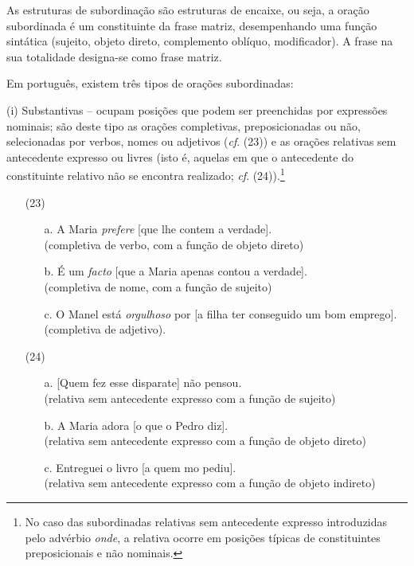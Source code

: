 \documentclass[output=paper,colorlinks,citecolor=brown,booklanguage=portuguese]{langscibook}
\begin{document}
As estruturas de subordinação são estruturas de encaixe, ou seja, a oração subordinada é um constituinte da frase matriz, desempenhando uma função sintática (sujeito, objeto direto, complemento oblíquo, modificador). A frase na sua totalidade designa-se como frase matriz. 

Em português, existem três tipos de orações subordinadas:
 
(i) Substantivas – ocupam posições que podem ser preenchidas por expressões nominais; são deste tipo as orações completivas, preposicionadas ou não, selecionadas por verbos, nomes ou adjetivos (\emph{cf}. (23)) e as orações relativas sem antecedente expresso ou livres (isto é, aquelas em que o antecedente do constituinte relativo não se encontra realizado; \emph{cf}. (24)).\footnote{No caso das subordinadas relativas sem antecedente expresso introduzidas pelo advérbio \emph{onde}, a relativa ocorre em posições típicas de constituintes preposicionais e não nominais.}

\begin{enumerate}[align=left]
    \item[(23)]
    \begin{enumerate}
        \item [a.] A Maria \emph{prefere} [que lhe contem a verdade]. \\          (completiva de verbo, com a função de objeto direto)
	\item[b.] É um \emph{facto} [que a Maria apenas contou a verdade].\\ (completiva de nome, com a função de sujeito)
	\item[c.] O Manel está \emph{orgulhoso} por [a filha ter conseguido um bom emprego].\\ (completiva de adjetivo).
    \end{enumerate}
    \item[(24)]
    \begin{enumerate}
        \item [a.] [Quem fez esse disparate] não pensou.   \\                        (relativa sem antecedente expresso com a função de sujeito)
	\item[b.] A Maria adora [o que o Pedro diz]. \\
	(relativa sem antecedente expresso com a função de objeto direto)
\item[c.] Entreguei o livro [a quem mo pediu]. \\                                      (relativa sem antecedente expresso com a função de objeto indireto)
    \end{enumerate}
\end{enumerate}
\end{document}
